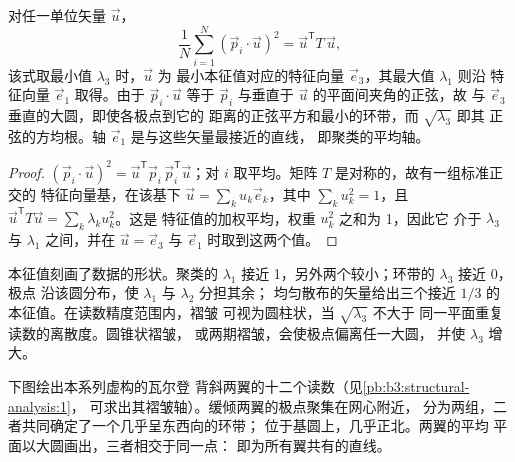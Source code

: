 \begin{theorem}[由方位张量得到的聚类与环带]\label{thm:b3:structural-analysis:tensor}
对任一单位矢量 $\vec u$，
\[
  \frac1N\sum_{i=1}^N (\vec p_i\cdot\vec u)^2 = \vec u^{\mathsf T}T\,\vec u ,
\]
该式取最小值 $\lambda_3$ 时，$\vec u$ 为
最小本征值对应的特征向量 $\vec e_3$，其最大值 $\lambda_1$ 则沿
特征向量 $\vec e_1$ 取得。由于 $\vec p_i\cdot\vec u$ 等于
$\vec p_i$ 与垂直于 $\vec u$ 的平面间夹角的正弦，故
与 $\vec e_3$ 垂直的大圆，即使各极点到它的
距离的正弦平方和最小的环带，而 $\sqrt{\lambda_3}$ 即其
正弦的方均根。轴 $\vec e_1$ 是与这些矢量最接近的直线，
即聚类的平均轴。
\end{theorem}

\begin{proof}
$(\vec p_i\cdot\vec u)^2 = \vec u^{\mathsf T}\vec p_i\,\vec p_i^{\mathsf T}\vec
u$；对 $i$ 取平均。矩阵 $T$ 是对称的，故有一组标准正交的
特征向量基，在该基下 $\vec u = \sum_k u_k\vec e_k$，其中 $\sum_k
u_k^2 = 1$，且 $\vec u^{\mathsf T}T\vec u = \sum_k\lambda_k u_k^2$。这是
特征值的加权平均，权重 $u_k^2$ 之和为 1，因此它
介于 $\lambda_3$ 与 $\lambda_1$ 之间，并在 $\vec u = \vec
e_3$ 与 $\vec e_1$ 时取到这两个值。
\end{proof}

本征值刻画了数据的形状。聚类的 $\lambda_1$ 接近
1，另外两个较小；环带的 $\lambda_3$ 接近 0，极点
沿该圆分布，使 $\lambda_1$ 与 $\lambda_2$ 分担其余；
均匀散布的矢量给出三个接近 $1/3$ 的本征值。在读数精度范围内，褶皱
可视为圆柱状，当 $\sqrt{\lambda_3}$ 不大于
同一平面重复读数的离散度。圆锥状褶皱，
或两期褶皱，会使极点偏离任一大圆，
并使 $\lambda_3$ 增大。

下图绘出本系列虚构的瓦尔登
背斜两翼的十二个读数（见\cref{pb:b3:structural-analysis:1}，
可求出其褶皱轴）。缓倾两翼的极点聚集在网心附近，
分为两组，二者共同确定了一个几乎呈东西向的环带；
位于基圆上，几乎正北。两翼的平均
平面以大圆画出，三者相交于同一点：
即为所有翼共有的直线。

